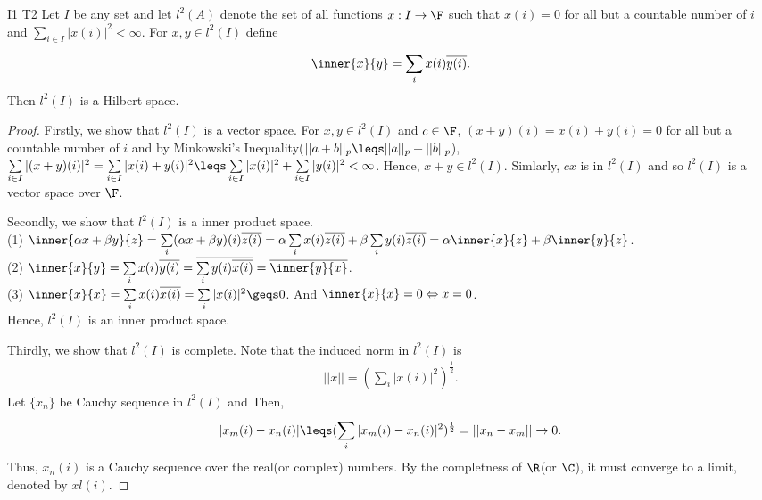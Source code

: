 \begin{exercise}{I1 T2}{}
    Let $I$ be any set and let $l^2(A)$ denote the set of all functions $x:I\rightarrow \F$ such that $x(i)=0$ for all but a countable number of $i$ and 
    $\sum\limits_{i\in I}|x(i)|^2<\infty$. For $x,y\in l^2(I)$ define
    \begin{align*}
        \inner{x}{y} = \sum\limits_{i}^{}x(i)\overline{y(i)}.
    \end{align*}
    Then $l^2(I)$ is a Hilbert space.
\end{exercise}
\begin{proof}
    Firstly, we show that $l^2(I)$ is a vector space.
    For $x,y\in l^2(I)$ and $c\in \F$, $(x+y)(i)=x(i)+y(i)=0$ for all but a countable number of $i$ and 
    by Minkowski's Inequality($||a+b||_p\leqs ||a||_p+||b||_p$), $\sum\limits_{i\in I}|(x+y)(i)|^2=\sum\limits_{i\in I}|x(i)+y(i)|^2\leqs \sum\limits_{i\in I}|x(i)|^2+\sum\limits_{i\in I}|y(i)|^2<\infty$.
    Hence, $x+y\in l^2(I)$. Simlarly, $cx$ is in $l^2(I)$ and so $l^2(I)$ is a vector space over $\F$.
    \par
    Secondly, we show that $l^2(I)$ is a inner product space. \\
    (1) $\inner{\alpha x+\beta y}{z}=\sum\limits_{i}(\alpha x+\beta y)(i)\overline{z(i)}=\alpha\sum\limits_{i}x(i)\overline{z(i)}+\beta\sum\limits_{i}y(i)\overline{z(i)}=\alpha\inner{x}{z}+\beta\inner{y}{z}$.\\
    (2) $\inner{x}{y}=\sum\limits_{i}x(i)\overline{y(i)}=\overline{\sum\limits_{i}y(i)\overline{x(i)}}=\overline{\inner{y}{x}}$.\\
    (3) $\inner{x}{x}=\sum\limits_{i}x(i)\overline{x(i)}=\sum\limits_{i}|x(i)|^2\geqs 0$. And $\inner{x}{x}=0\Leftrightarrow x=0$.\\
    Hence, $l^2(I)$ is an inner product space.
    \par
    Thirdly, we show that $l^2(I)$ is complete.
    Note that the induced norm in $l^2(I)$ is
    \begin{align*}
        ||x|| = (\sum\limits_{i}^{}{|x(i)|}^{2})^{\frac{1}{2}}.
    \end{align*}
    Let $\{x_n\}$ be Cauchy sequence in $l^2(I)$ and 
    Then, 
    \begin{align*}
        |x_m(i)-x_n(i)|\leqs (\sum\limits_{i}^{}|x_m(i)-x_n(i)|^2)^{\frac{1}{2}}=||x_n-x_m||\rightarrow 0.
    \end{align*}
    Thus, $x_n(i)$ is a Cauchy sequence over the real(or complex) numbers. By the completness of $\R$(or $\C$), it must converge to a limit, denoted by $xl(i)$.

\end{proof}
